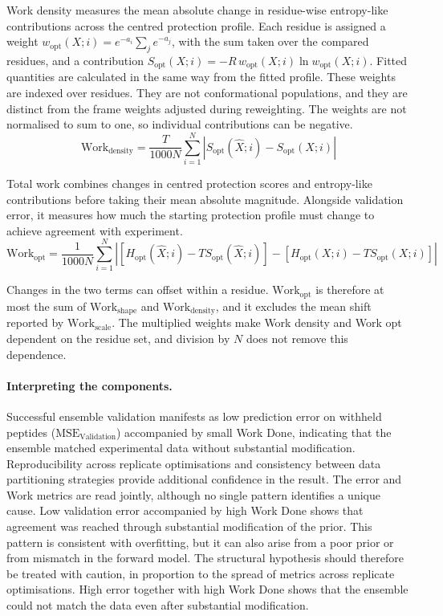 Work density measures the mean absolute change in residue-wise entropy-like contributions across the centred protection profile. Each residue is assigned a weight $w_\text{opt}(X;i)=e^{-a_i}\sum_j e^{-a_j}$, with the sum taken over the compared residues, and a contribution $S_\text{opt}(X;i)=-R\,w_\text{opt}(X;i)\ln w_\text{opt}(X;i)$. Fitted quantities are calculated in the same way from the fitted profile. These weights are indexed over residues. They are not conformational populations, and they are distinct from the frame weights adjusted during reweighting. The weights are not normalised to sum to one, so individual contributions can be negative.
\begin{equation}
    \text{Work}_\text{density}=\frac{T}{1000N}\sum_{i=1}^{N}\left|S_\text{opt}(\hat X;i)-S_\text{opt}(X;i)\right|
    \label{eq:valdx-work-density}
\end{equation}

Total work combines changes in centred protection scores and entropy-like contributions before taking their mean absolute magnitude. Alongside validation error, it measures how much the starting protection profile must change to achieve agreement with experiment.
\begin{equation}
    \text{Work}_\text{opt}
    =\frac{1}{1000N}\sum_{i=1}^{N}
    \left|
    \left[H_\text{opt}(\hat X;i)-TS_\text{opt}(\hat X;i)\right]
    -
    \left[H_\text{opt}(X;i)-TS_\text{opt}(X;i)\right]
    \right|
    \label{eq:valdx-work-opt}
\end{equation}

Changes in the two terms can offset within a residue. $\text{Work}_\text{opt}$ is therefore at most the sum of $\text{Work}_\text{shape}$ and $\text{Work}_\text{density}$, and it excludes the mean shift reported by $\text{Work}_\text{scale}$. The multiplied weights make Work density and Work opt dependent on the residue set, and division by $N$ does not remove this dependence.

\paragraph{Interpreting the components.}
Successful ensemble validation manifests as low prediction error on withheld peptides ($\text{MSE}_\text{Validation}$) accompanied by small Work Done, indicating that the ensemble matched experimental data without substantial modification. Reproducibility across replicate optimisations and consistency between data partitioning strategies provide additional confidence in the result. The error and Work metrics are read jointly, although no single pattern identifies a unique cause. Low validation error accompanied by high Work Done shows that agreement was reached through substantial modification of the prior. This pattern is consistent with overfitting, but it can also arise from a poor prior or from mismatch in the forward model. The structural hypothesis should therefore be treated with caution, in proportion to the spread of metrics across replicate optimisations. High error together with high Work Done shows that the ensemble could not match the data even after substantial modification.

